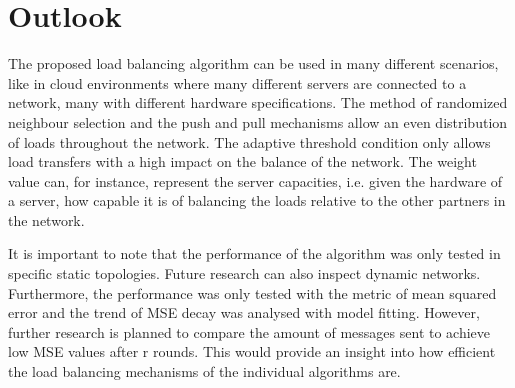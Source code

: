 \chapter{Outlook}\label{chap:outlook}
The proposed load balancing algorithm can be used in many different scenarios, like in cloud environments where many different servers are connected to a network, many with different hardware specifications. The method of randomized neighbour selection and the push and pull mechanisms allow an even distribution of loads throughout the network. The adaptive threshold condition only allows load transfers with a high impact on the balance of the network. The weight value can, for instance, represent the server capacities, i.e. given the hardware of a server, how capable it is of balancing the loads relative to the other partners in the network.

It is important to note that the performance of the algorithm was only tested in specific static topologies. Future research can also inspect dynamic networks. Furthermore, the performance was only tested with the metric of mean squared error and the trend of MSE decay was analysed with model fitting. However, further research is planned to compare the amount of messages sent to achieve low MSE values after r rounds. This would provide an insight into how efficient the load balancing mechanisms of the individual algorithms are.
